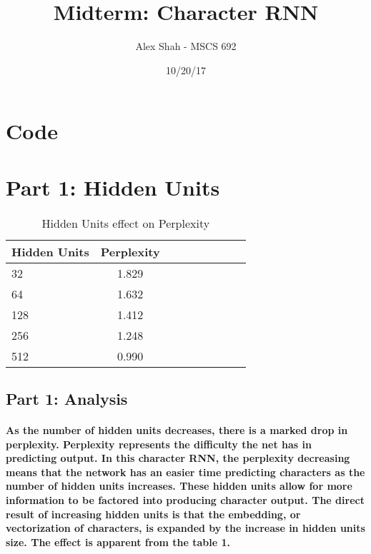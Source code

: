 \documentclass[10pt,a4paper]{report}
\title{Midterm: Character RNN}
\author{Alex Shah - MSCS 692}
\date{10/20/17}
\begin{document}
\lstset{language=Python}
\maketitle

\section{Code}


\clearpage

\section{Part 1: Hidden Units}

\begin{table}[h]
 \caption{Hidden Units effect on Perplexity}
 \label{tbl:aTable}
 \begin{center}
  \begin{tabular}{lccrrrrrr}
    \hline 
	Hidden Units & Perplexity\\
	\hline
	32 & 1.829\\
	64 & 1.632\\
	128 & 1.412\\
	256 & 1.248\\
	512 & 0.990\\
  \end{tabular}
 \end{center}
\end{table}

\subsection{Part 1: Analysis}

\paragraph{
As the number of hidden units decreases, there is a marked drop in perplexity. Perplexity represents the difficulty the net has in predicting output. In this character RNN, the perplexity decreasing means that the network has an easier time predicting characters as the number of hidden units increases. These hidden units allow for more information to be factored into producing character output. The direct result of increasing hidden units is that the embedding, or vectorization of characters, is expanded by the increase in hidden units size. The effect is apparent from the table 1.
}
\
\vspace{5mm}
\end{document}
